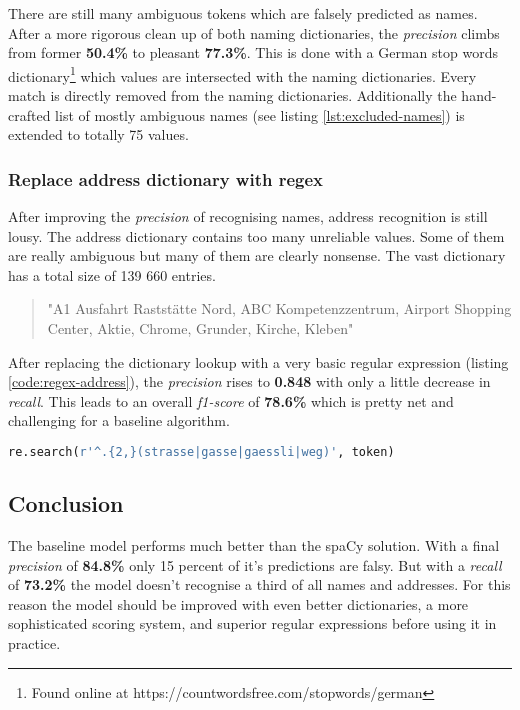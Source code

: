There are still many ambiguous tokens which are falsely predicted as names. After a more rigorous clean up of both naming dictionaries, the \emph{precision} climbs
from former \textbf{50.4\%} to pleasant \textbf{77.3\%}. This is done with a German stop words dictionary\footnote{Found online at
https://countwordsfree.com/stopwords/german} which values are intersected with the naming dictionaries. Every match is directly removed from the naming dictionaries.
Additionally the hand-crafted list of mostly ambiguous names (see listing \ref{lst:excluded-names}) is extended to totally 75 values.

\subsubsection{Replace address dictionary with regex}

After improving the \emph{precision} of recognising names, address recognition is still lousy. The address dictionary contains too many unreliable values. Some of
them are really ambiguous but many of them are clearly nonsense. The vast dictionary has a total size of 139 660 entries.

\begin{quote}
    "A1 Ausfahrt Raststätte Nord, ABC Kompetenzzentrum, Airport Shopping Center, Aktie, Chrome, Grunder, Kirche, Kleben"
\end{quote}

After replacing the dictionary lookup with a very basic regular expression (listing \ref{code:regex-address}), the \emph{precision} rises to \textbf{0.848} with only
a little decrease in \emph{recall}. This leads to an overall \emph{f1-score} of \textbf{78.6\%} which is pretty net and challenging for a baseline algorithm.

\begin{lstlisting}[language=Python, label={code:regex-address}, caption=Very basic regular expression for detecting addresses]
re.search(r'^.{2,}(strasse|gasse|gaessli|weg)', token)
\end{lstlisting}

\subsection{Conclusion}

The baseline model performs much better than the spaCy solution. With a final \emph{precision} of \textbf{84.8\%} only 15 percent of it's predictions are falsy. But
with a \emph{recall} of \textbf{73.2\%} the model doesn't recognise a third of all names and addresses. For this reason the model should be improved with even better
dictionaries, a more sophisticated scoring system, and superior regular expressions before using it in practice.

